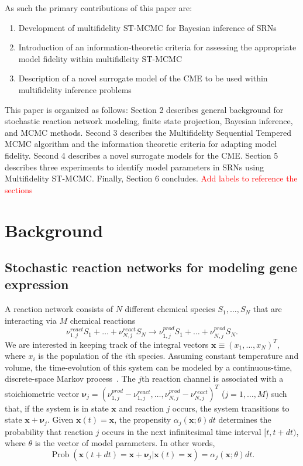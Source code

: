 \documentclass[1p]{article}
\begin{document}
As such the primary contributions of this paper are:
\begin{enumerate}
\item Development of multifidelity ST-MCMC for Bayesian inference of SRNs
\item Introduction of an information-theoretic criteria for assessing the appropriate model fidelity within multifidleity ST-MCMC
\item Description of a novel surrogate model of the CME to be used within multifidelity inference problems
\end{enumerate}

This paper is organized as follows: Section 2 describes general background for stochastic reaction network modeling, finite state projection, Bayesian inference, and MCMC methods. Second 3 describes the  Multifidelity Sequential Tempered MCMC algorithm and the information theoretic criteria for adapting model fidelity. Second 4 describes a novel surrogate models for the CME. Section 5 describes three experiments to identify model parameters in SRNs using Multifidelity ST-MCMC. Finally, Section 6 concludes. \textcolor{red}{Add labels to reference the sections}

\section{Background}
\subsection{Stochastic reaction networks for modeling gene expression}
A reaction network consists of $N$ different chemical species $S_1, \ldots, S_N$
that are interacting via $M$ chemical reactions
\begin{equation}
  \label{eq:reaction}
  \nu_{1,j}^{react}S_1 + \ldots + \nu_{N,j}^{react}S_N
  \longrightarrow
  \nu_{1,j}^{prod}S_1 + \ldots + \nu_{N,j}^{prod}S_N
  .
\end{equation}
We are interested in keeping track of the integral vectors
$\bm{x} \equiv (x_1, \dots, x_N )^T$, where $x_i$ is the
population
of the $i$th species.
Assuming constant temperature and volume, the time-evolution of this system can be modeled by a continuous-time, discrete-space Markov process~\cite{Gillespie1992}.
The $j$th reaction channel is associated with a stoichiometric vector
$\bm{\nu}_j = (\nu_{1,j}^{prod} - \nu_{1,j}^{react}, \ldots, \nu_{N,j}^{prod} - \nu_{N,j}^{react})^T$ ($j=1,\ldots,M$) such that, if the
system is in state $\bm{x}$ and reaction $j$ occurs, the system
transitions to state $\bm{x}+\bm{\nu}_j$.
Given $\bm{x}(t)=\bm{x}$, the propensity $\alpha_j(\bm{x}; \theta)dt$ determines the probability that reaction $j$ occurs in the next infinitesimal time
interval $[t,t+dt)$, where $\theta$ is the vector of model parameters. In other words,
$$\operatorname{Prob}(\bm{x}(t + dt) = \bm{x} + \bm{\nu}_j | \bm{x}(t) = \bm{x}) = \alpha_j(\bm{x};\theta)dt.$$
\end{document}

